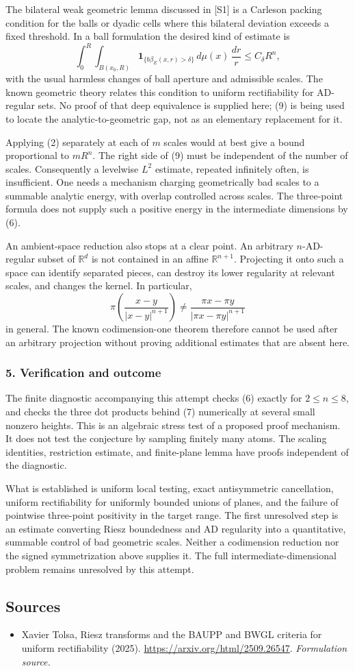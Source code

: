\documentclass[11pt]{article}
\begin{document}
The bilateral weak geometric lemma discussed in [S1] is a Carleson packing condition for the balls or dyadic cells where this bilateral deviation exceeds a fixed threshold. In a ball formulation the desired kind of estimate is
\[
 \int_0^R\int_{B(x_0,R)}
 \mathbf1_{\{b\beta_E(x,r)>\delta\}}\,d\mu(x)\,\frac{dr}{r}
 \leq C_\delta R^n,                                      \tag{9}
\]
with the usual harmless changes of ball aperture and admissible scales. The known geometric theory relates this condition to uniform rectifiability for AD-regular sets. No proof of that deep equivalence is supplied here; (9) is being used to locate the analytic-to-geometric gap, not as an elementary replacement for it.

Applying (2) separately at each of $m$ scales would at best give a bound proportional to $mR^n$. The right side of (9) must be independent of the number of scales. Consequently a levelwise $L^2$ estimate, repeated infinitely often, is insufficient. One needs a mechanism charging geometrically bad scales to a summable analytic energy, with overlap controlled across scales. The three-point formula does not supply such a positive energy in the intermediate dimensions by (6).

An ambient-space reduction also stops at a clear point. An arbitrary $n$-AD-regular subset of $\mathbb R^d$ is not contained in an affine $\mathbb R^{n+1}$. Projecting it onto such a space can identify separated pieces, can destroy its lower regularity at relevant scales, and changes the kernel. In particular,
\[
 \pi\!\left(\frac{x-y}{|x-y|^{n+1}}\right)
 \ne \frac{\pi x-\pi y}{|\pi x-\pi y|^{n+1}}
\]
in general. The known codimension-one theorem therefore cannot be used after an arbitrary projection without proving additional estimates that are absent here.

\subsubsection{5. Verification and outcome}
The finite diagnostic accompanying this attempt checks (6) exactly for $2\leq n\leq8$, and checks the three dot products behind (7) numerically at several small nonzero heights. This is an algebraic stress test of a proposed proof mechanism. It does not test the conjecture by sampling finitely many atoms. The scaling identities, restriction estimate, and finite-plane lemma have proofs independent of the diagnostic.

What is established is uniform local testing, exact antisymmetric cancellation, uniform rectifiability for uniformly bounded unions of planes, and the failure of pointwise three-point positivity in the target range. The first unresolved step is an estimate converting Riesz boundedness and AD regularity into a quantitative, summable control of bad geometric scales. Neither a codimension reduction nor the signed symmetrization above supplies it. The full intermediate-dimensional problem remains unresolved by this attempt.

\subsection{Sources}
\begin{itemize}
\item[S1]Xavier Tolsa, Riesz transforms and the BAUPP and BWGL criteria for uniform rectifiability (2025).
\url{https://arxiv.org/html/2509.26547}.
\textit{Formulation source.}
\end{itemize}
\end{document}
